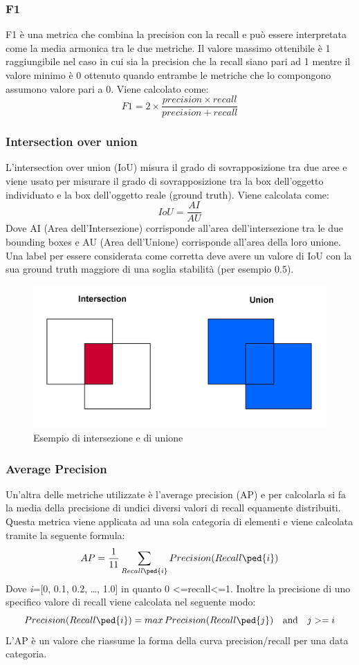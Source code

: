 \subsubsection{F1}
F1 è una metrica che combina la precision con la recall e può essere interpretata come la media armonica tra le due metriche. Il valore massimo ottenibile è 1 raggiungibile nel caso in cui sia la precision che la recall siano pari ad 1 mentre il valore minimo è 0 ottenuto quando entrambe le metriche che lo compongono assumono valore pari a 0. Viene calcolato come:
\[
    F1 = 2 \times \frac{precision \times recall}{precision + recall}
\]
\subsubsection{Intersection over union}
L'intersection over union (IoU) misura il grado di sovrapposizione tra due aree e viene usato per misurare il grado di sovrapposizione tra la box dell'oggetto individuato e la box dell'oggetto reale (ground truth). Viene calcolata come:
\[
    IoU = \frac{AI}{AU}
\]
Dove AI (Area dell'Intersezione) corrisponde all'area dell'intersezione tra le due bounding boxes e AU (Area dell'Unione) corrisponde all'area della loro unione.
Una label per essere considerata come corretta deve avere un valore di IoU con la sua ground truth maggiore di una soglia stabilità (per esempio 0.5).
\begin{figure}[H]
	\centering
	\includegraphics[width=0.5\linewidth]{images/unione-intersezione.jpg}
	\caption{Esempio di intersezione e di unione}
	\label{Esempio di intersezione e di unione}
\end{figure}
\subsubsection{Average Precision}
Un'altra delle metriche utilizzate è l'average precision (AP) e per calcolarla si fa la media della precisione di undici diversi valori di recall equamente distribuiti. Questa metrica viene applicata ad una sola categoria di elementi e viene calcolata tramite la seguente formula:
\[
    AP = \frac{1}{11}\sum_{Recall\ped{i}}^{} Precision(Recall\ped{i})
\]
Dove \textit{i}=[0, 0.1, 0.2, …, 1.0] in quanto 0 \textless =recall\textless =1. Inoltre la precisione di uno specifico valore di recall viene calcolata nel seguente modo:
\[
    Precision(Recall\ped{i}) = max\,Precision(Recall\ped{j}) \quad \textrm{and} \quad j>=i
\]
L'AP è un valore che riassume la forma della curva precision/recall per una data categoria.
